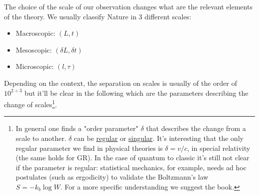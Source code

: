 \documentclass{article}
\begin{document}
The choice of the scale of our observation changes what are the relevant elements of the theory. We usually classify Nature in 3 different scales:
\begin{itemize}
    \item Macroscopic: $(L,t) $
    \item Mesoscopic:  $(\delta L, \delta t) $
    \item Microscopic: $(l,\tau)$
\end{itemize}
Depending on the context, the separation on scales is usually of the order of $10^{2 \div 3}$ but it'll be clear in the following which are the parameters describing the change of scales\footnote{In general one finds a "order parameter" $\delta$ that describes the change from a scale to another. $\delta$ can be \underline{regular} or \underline{singular}. It's interesting that the only regular parameter we find in physical theories is $\delta = v/c$, in special relativity (the same holds for GR). In the case of quantum to classic it's still not clear if the parameter is regular: statistical mechanics, for example, needs ad hoc postulates (such as ergodicity) to validate the Boltzmann's law $S = -k_b \log W$. For  a more specific understanding we suggest the book.   }. 
\newpage
\def \x_v{\mathbf{x}}
\def \v_v{\mathbf{v}}
\end{document}
